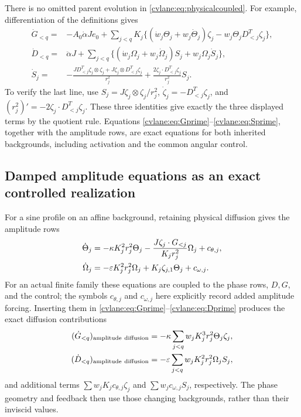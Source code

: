 There is no omitted parent evolution in \eqref{cvlane:eq:physicalcoupled}.
For example, differentiation of the definitions gives
\begin{align}
 \dot G_{<q}={}&-A_0\dot\alpha Je_0+
 \sum_{j<q}K_j\{(\dot w_j\Theta_j+w_j\dot\Theta_j)\zeta_j
 -w_j\Theta_jD_{<j}^T\zeta_j\},\label{cvlane:eq:Gprime}\\
 \dot D_{<q}={}&\ddot\alpha J+
 \sum_{j<q}\{(\dot w_j\Omega_j+w_j\dot\Omega_j)S_j
 +w_j\Omega_j\dot S_j\},\label{cvlane:eq:Dprime}\\
 \dot S_j={}&-\frac{JD_{<j}^T\zeta_j\otimes\zeta_j
 +J\zeta_j\otimes D_{<j}^T\zeta_j}{r_j^2}
 +\frac{2\zeta_j\cdot D_{<j}^T\zeta_j}{r_j^2}S_j.
 \label{cvlane:eq:Sprime}
\end{align}
To verify the last line, use $S_j=J\zeta_j\otimes\zeta_j/r_j^2$,
$\dot\zeta_j=-D_{<j}^T\zeta_j$, and
$(r_j^2)'=-2\zeta_j\cdot D_{<j}^T\zeta_j$. These three
identities give exactly the three displayed terms by the quotient
rule. Equations \eqref{cvlane:eq:Gprime}--\eqref{cvlane:eq:Sprime}, together
with the amplitude rows, are exact equations for both inherited
backgrounds, including activation and the common angular control.

\subsection{Damped amplitude equations as an exact controlled realization}
For a sine profile on an affine background, retaining physical
diffusion gives the amplitude rows
\begin{align}
 \dot\Theta_j&=-\kappa K_j^2r_j^2\Theta_j
 -\frac{J\zeta_j\cdot G_{<j}}{K_jr_j^2}\Omega_j+c_{\theta,j},\notag\\
 \dot\Omega_j&=-\varepsilon K_j^2r_j^2\Omega_j
 +K_j\zeta_{j,1}\Theta_j+c_{\omega,j}.
 \label{cvlane:eq:dampedjet}
\end{align}
For an actual finite family these equations are coupled to the
phase rows, $D,G$, and the control; the symbols $c_{\theta,j}$ and
$c_{\omega,j}$ here explicitly record added amplitude forcing.
Inserting them in \eqref{cvlane:eq:Gprime}--\eqref{cvlane:eq:Dprime} produces
the exact diffusion contributions
\begin{align}
 (\dot G_{<q})_{\rm amplitude\ diffusion}
 &=-\kappa\sum_{j<q}w_jK_j^3r_j^2\Theta_j\zeta_j,\notag\\
 (\dot D_{<q})_{\rm amplitude\ diffusion}
 &=-\varepsilon\sum_{j<q}w_jK_j^2r_j^2\Omega_jS_j,
 \label{cvlane:eq:parentdiffusion}
\end{align}
and additional terms $\sum w_jK_jc_{\theta,j}\zeta_j$ and
$\sum w_jc_{\omega,j}S_j$, respectively. The phase geometry
and feedback then use those changing backgrounds, rather than
their inviscid values.

